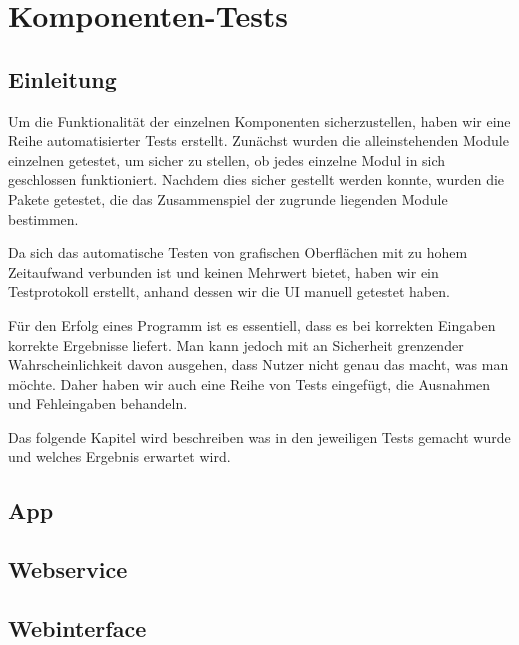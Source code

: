 \section{Komponenten-Tests}

\subsection{Einleitung}
Um die Funktionalität der einzelnen Komponenten sicherzustellen, haben wir eine Reihe automatisierter Tests erstellt. Zunächst wurden die alleinstehenden Module einzelnen getestet, um sicher zu stellen, ob jedes einzelne Modul in sich geschlossen funktioniert. Nachdem dies sicher gestellt werden konnte, wurden die Pakete getestet, die das Zusammenspiel der zugrunde liegenden Module bestimmen.\par
Da sich das automatische Testen von grafischen Oberflächen mit zu hohem Zeitaufwand verbunden ist und keinen Mehrwert bietet, haben wir ein Testprotokoll erstellt, anhand dessen wir die UI manuell getestet haben.\par
Für den Erfolg eines Programm ist es essentiell, dass es bei korrekten Eingaben korrekte Ergebnisse liefert. Man kann jedoch mit an Sicherheit grenzender Wahrscheinlichkeit davon ausgehen, dass Nutzer nicht genau das macht, was man möchte. Daher haben wir auch eine Reihe von Tests eingefügt, die Ausnahmen und Fehleingaben behandeln.\par
Das folgende Kapitel wird beschreiben was in den jeweiligen Tests gemacht wurde und welches Ergebnis erwartet wird.

\subsection{App}

\subsection{Webservice}

\subsection{Webinterface}
